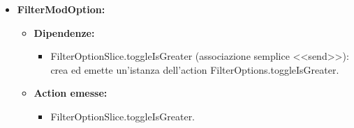 \begin{itemize}
      \item \textbf{FilterModOption:}
            \begin{itemize}
                  \item \textbf{Dipendenze:}
                        \begin{itemize}
                              \item FilterOptionSlice.toggleIsGreater (associazione semplice <<send>>): crea ed
                                    emette un'istanza dell'action FilterOptions.toggleIsGreater.
                        \end{itemize}
                  \item \textbf{Action emesse:}
                        \begin{itemize}
                              \item FilterOptionSlice.toggleIsGreater.
                        \end{itemize}
            \end{itemize}
\end{itemize}

